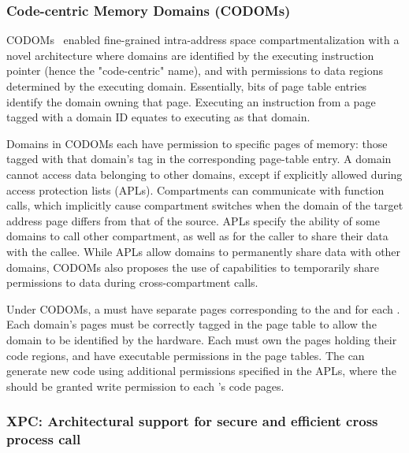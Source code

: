 \subsubsection{Code-centric Memory Domains (CODOMs)}
CODOMs~\cite{VilanovaBNEV14} enabled fine-grained intra-address space 
compartmentalization
with a novel architecture where domains are identified by the executing
instruction pointer (hence the "code-centric" name), and with permissions
to data regions determined by the executing domain. 
Essentially, bits of page table entries identify the domain owning that
page.
Executing an instruction from a page tagged with a domain ID equates to
executing as that domain.

Domains in CODOMs each have permission to specific pages of memory: 
those tagged with that domain's tag in the corresponding page-table entry.
A domain cannot access data belonging to other domains, except if
explicitly allowed during access protection lists (APLs).
Compartments can communicate with function calls, which implicitly
cause compartment switches when the domain of the target address page
differs from that of the source.
APLs specify the ability of some domains to call other compartment,
as well as for the caller to share their data with the callee.
While APLs allow domains to permanently share data with other domains,
CODOMs also proposes the use of capabilities to temporarily share
permissions to data during cross-compartment calls.

Under CODOMs, a \browser must have separate pages corresponding to the
\renderer and for each \sandbox. 
Each domain's pages must be correctly tagged in the page table to allow
the domain to be identified by the hardware.
Each \sandbox must own the pages holding their code regions, and have
executable permissions in the page tables. 
The \renderer can generate new code using additional permissions specified
in the APLs, where the \renderer should be granted write permission to
each \sandbox's code pages.

\subsubsection{XPC: Architectural support for secure and efficient cross process call}

